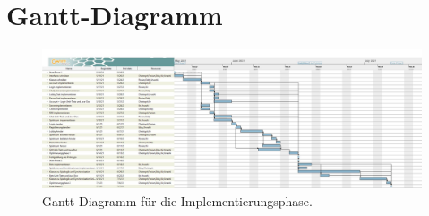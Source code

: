\chapter{Gantt-Diagramm}


\begin{figure}[ht]
	\centering
	\includegraphics[width=\textwidth]{sonstige-diagramme/gantt-diagramm.jpg}
	\caption{Gantt-Diagramm für die Implementierungsphase.}
\end{figure}
